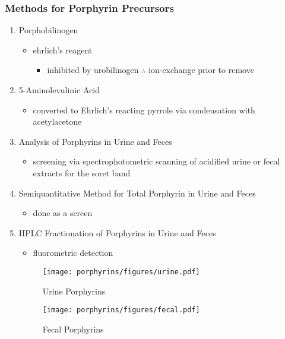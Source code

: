 \documentclass[12pt]{scrartcl}
\begin{document}
\subsubsection{Methods for Porphyrin Precursors}
\label{sec:org79da520}
\begin{enumerate}
\item Porphobilinogen
\label{sec:org7586c2b}
\begin{itemize}
\item ehrlich's reagent
\begin{itemize}
\item inhibited by urobilinogen \(\therefore\) ion-exchange prior to remove
\end{itemize}
\end{itemize}
\item 5-Aminolevulinic Acid
\label{sec:orgebd2d6d}
\begin{itemize}
\item converted to Ehrlich's reacting pyrrole via condensation with
acetylacetone
\end{itemize}
\item Analysis of Porphyrins in Urine and Feces
\label{sec:orgde66995}
\begin{itemize}
\item screening via spectrophotometric scanning of acidified urine or
fecal extracts for the soret band
\end{itemize}
\item Semiquantitative Method for Total Porphyrin in Urine and Feces
\label{sec:org0c77e49}
\begin{itemize}
\item done as a screen
\end{itemize}
\item HPLC Fractionation of Porphyrins in Urine and Feces
\label{sec:orga9718c3}
\begin{itemize}
\item fluorometric detection
\end{itemize}

\begin{figure}[htbp]
\centering
\texttt{[image: porphyrins/figures/urine.pdf]}
\caption{\label{fig:orgf50396a}Urine Porphyrins}
\end{figure}

\begin{figure}[htbp]
\centering
\texttt{[image: porphyrins/figures/fecal.pdf]}
\caption{\label{fig:org9ba0b6e}Fecal Porphyrins}
\end{figure}
\end{enumerate}
\end{document}
